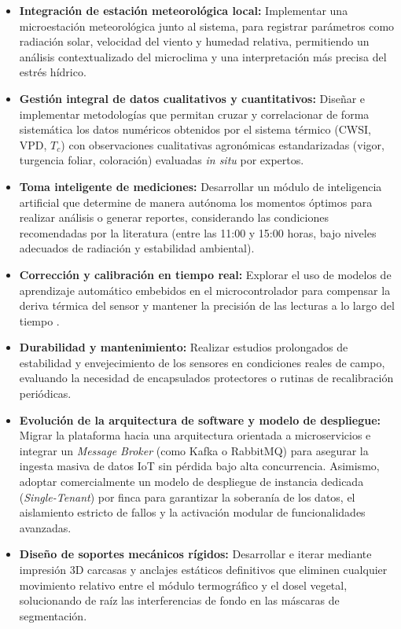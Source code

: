 \begin{itemize}
    \item \textbf{Integración de estación meteorológica local:}  
    Implementar una microestación meteorológica junto al sistema, para registrar parámetros como radiación solar, velocidad del viento y humedad relativa, permitiendo un análisis contextualizado del microclima y una interpretación más precisa del estrés hídrico.

    \item \textbf{Gestión integral de datos cualitativos y cuantitativos:}  
    Diseñar e implementar metodologías que permitan cruzar y correlacionar de forma sistemática los datos numéricos obtenidos por el sistema térmico (CWSI, VPD, $T_c$) con observaciones cualitativas agronómicas estandarizadas (vigor, turgencia foliar, coloración) evaluadas \textit{in situ} por expertos. 

    \item \textbf{Toma inteligente de mediciones:}  
    Desarrollar un módulo de inteligencia artificial que determine de manera autónoma los momentos óptimos para realizar análisis o generar reportes, considerando las condiciones recomendadas por la literatura (entre las 11:00 y 15:00 horas, bajo niveles adecuados de radiación y estabilidad ambiental).  

    \item \textbf{Corrección y calibración en tiempo real:}  
    Explorar el uso de modelos de aprendizaje automático embebidos en el microcontrolador para compensar la deriva térmica del sensor y mantener la precisión de las lecturas a lo largo del tiempo .

    \item \textbf{Durabilidad y mantenimiento:}  
    Realizar estudios prolongados de estabilidad y envejecimiento de los sensores en condiciones reales de campo, evaluando la necesidad de encapsulados protectores o rutinas de recalibración periódicas.

    \item \textbf{Evolución de la arquitectura de software y modelo de despliegue:} 
    Migrar la plataforma hacia una arquitectura orientada a microservicios e integrar un \textit{Message Broker} (como Kafka o RabbitMQ) para asegurar la ingesta masiva de datos IoT sin pérdida bajo alta concurrencia. Asimismo, adoptar comercialmente un modelo de despliegue de instancia dedicada (\textit{Single-Tenant}) por finca para garantizar la soberanía de los datos, el aislamiento estricto de fallos y la activación modular de funcionalidades avanzadas.

    \item \textbf{Diseño de soportes mecánicos rígidos:} 
    Desarrollar e iterar mediante impresión 3D carcasas y anclajes estáticos definitivos que eliminen cualquier movimiento relativo entre el módulo termográfico y el dosel vegetal, solucionando de raíz las interferencias de fondo en las máscaras de segmentación.
\end{itemize}